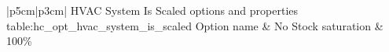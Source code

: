 \begin{customLongTable}{ |p{5cm}|p{3cm}| }
{HVAC System Is Scaled options and properties} {table:hc_opt_hvac_system_is_scaled}
{Option name & No}
\endhead
\hline
Stock saturation & 100\% \\ \hline
\end{customLongTable}

